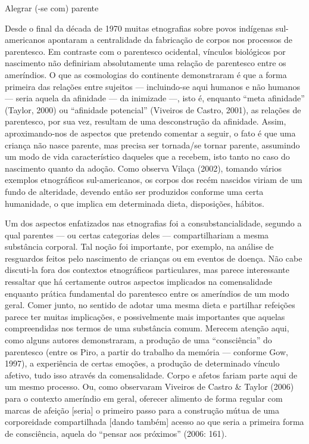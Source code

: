 \documentclass{article}
\begin{document}
Alegrar (-se com) parente

Desde o final da d\'ecada de 1970 muitas etnografias sobre povos
ind\'igenas sul-americanos apontaram a centralidade da fabrica\c{c}\~ao
de corpos nos processos de parentesco. Em contraste com o parentesco
ocidental, v\'inculos biol\'ogicos por nascimento n\~ao definiriam
absolutamente uma rela\c{c}\~ao de parentesco entre os amer\'indios. O
que as cosmologias do continente demonstraram \'e que a forma primeira
das rela\c{c}\~oes entre sujeitos --- incluindo-se aqui humanos e n\~ao
humanos --- seria aquela da afinidade --- da inimizade ---, isto \'e,
enquanto {\textquotedblleft}meta afinidade{\textquotedblright} (Taylor,
2000) ou {\textquotedblleft}afinidade potencial{\textquotedblright}
(Viveiros de Castro, 2001), as rela\c{c}\~oes de parentesco, por sua
vez, resultam de uma desconstru\c{c}\~ao da afinidade. Assim,
aproximando-nos de aspectos que pretendo comentar a seguir, o fato \'e
que uma crian\c{c}a n\~ao nasce parente, mas precisa ser tornada/se
tornar parente, assumindo um modo de vida caracter\'istico daqueles que
a recebem, isto tanto no caso do nascimento quanto da ado\c{c}\~ao.
Como observa Vila\c{c}a (2002), tomando v\'arios exemplos
etnogr\'aficos sul-americanos, os corpos dos rec\'em nascidos viriam de
um fundo de alteridade, devendo ent\~ao ser produzidos conforme uma
certa humanidade, o que implica em determinada dieta,
disposi\c{c}\~oes, h\'abitos.

Um dos aspectos enfatizados nas etnografias foi a consubstancialidade,
segundo a qual parentes --- ou certas categorias deles ---
compartilhariam a mesma subst\^ancia corporal. Tal no\c{c}\~ao foi
importante, por exemplo, na an\'alise de resguardos feitos pelo
nascimento de crian\c{c}as ou em eventos de doen\c{c}a. N\~ao cabe
discuti-la fora dos contextos etnogr\'aficos particulares, mas parece
interessante ressaltar que h\'a certamente outros aspectos implicados
na comensalidade enquanto pr\'atica fundamental do parentesco entre os
amer\'indios de um modo geral. Comer junto, no sentido de adotar uma
mesma dieta e partilhar refei\c{c}\~oes parece ter muitas
implica\c{c}\~oes, e possivelmente mais importantes que aquelas
compreendidas nos termos de uma subst\^ancia comum. Merecem
aten\c{c}\~ao aqui, como alguns autores demonstraram, a produ\c{c}\~ao
de uma {\textquotedblleft}consci\^encia{\textquotedblright} do
parentesco (entre os Piro, a partir do trabalho da mem\'oria ---
conforme Gow, 1997), a experi\^encia de certas emo\c{c}\~oes, a
produ\c{c}\~ao de determinado v\'inculo afetivo, tudo isso atrav\'es da
comensalidade. Corpo e afetos fariam parte aqui de um mesmo processo.
Ou, como observaram Viveiros de Castro \& Taylor (2006) para o contexto
amer\'indio em geral, oferecer alimento de forma regular com marcas de
afei\c{c}\~ao [seria] o primeiro passo para a constru\c{c}\~ao m\'utua
de uma corporeidade compartilhada [dando tamb\'em] acesso ao que seria
a primeira forma de consci\^encia, aquela do {\textquotedblleft}pensar
aos pr\'oximos{\textquotedblright} (2006: 161).
\end{document}
